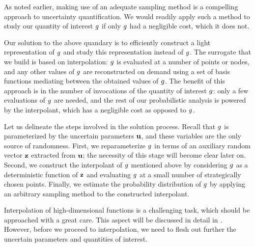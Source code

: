 As noted earlier, making use of an adequate sampling method is a compelling
approach to uncertainty quantification. We would readily apply such a method to
study our quantity of interest $g$ if only $g$ had a negligible cost, which it
does not.

Our solution to the above quandary is to efficiently construct a light
representation of $g$ and study this representation instead of $g$. The
surrogate that we build is based on interpolation: $g$ is evaluated at a number
of points or nodes, and any other values of $g$ are reconstructed on demand
using a set of basis functions mediating between the obtained values of $g$.
The benefit of this approach is in the number of invocations of the quantity of
interest $g$: only a few evaluations of $g$ are needed, and the rest of our
probabilistic analysis is powered by the interpolant, which has a negligible
cost as opposed to $g$.

Let us delineate the steps involved in the solution process. Recall that $g$ is
parameterized by the uncertain parameters $\mathbf{u}$, and these variables are the
only source of randomness. First, we reparameterize $g$ in terms of an
auxiliary random vector $\mathbf{z}$ extracted from $\mathbf{u}$; the necessity of this stage
will become clear later on. Second, we construct the interpolant of $g$
mentioned above by considering $g$ as a deterministic function of $\mathbf{z}$ and
evaluating $g$ at a small number of strategically chosen points. Finally, we
estimate the probability distribution of $g$ by applying an arbitrary sampling
method to the constructed interpolant.

Interpolation of high-dimensional functions is a challenging task, which should
be approached with a great care. This aspect will be discussed in detail in
. However, before we proceed to interpolation, we need to
flesh out further the uncertain parameters and quantities of interest.
